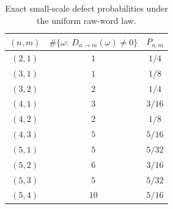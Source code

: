 \begin{table}[t]
\centering
\small
\renewcommand{\arraystretch}{1.15}
\begin{tabular}{ccc}
\toprule
$(n,m)$ & $\#\{\omega:\ D_{n\to m}(\omega)\ne 0\}$ & $P_{n,m}$ \\
\midrule
$(2,1)$ & $1$ & $1/4$ \\
$(3,1)$ & $1$ & $1/8$ \\
$(3,2)$ & $2$ & $1/4$ \\
$(4,1)$ & $3$ & $3/16$ \\
$(4,2)$ & $2$ & $1/8$ \\
$(4,3)$ & $5$ & $5/16$ \\
$(5,1)$ & $5$ & $5/32$ \\
$(5,2)$ & $6$ & $3/16$ \\
$(5,3)$ & $5$ & $5/32$ \\
$(5,4)$ & $10$ & $5/16$ \\
\bottomrule
\end{tabular}
\caption{Exact small-scale defect probabilities under the uniform raw-word law.}
\label{tab:small-values}
\end{table}

